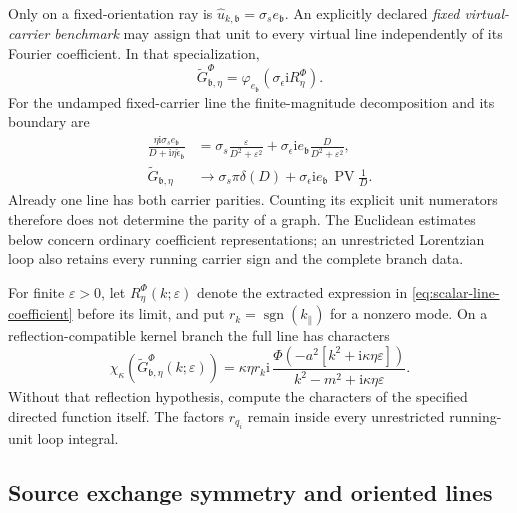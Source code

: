 \documentclass[final,5p,times,twocolumn,numbers,nopreprintline]{elsarticle}
\numberwithin{equation}{section}
\theoremstyle{definition}
\theoremstyle{remark}
\newcommand{\ii}{\mathrm i}
\newcommand{\bb}{\mathfrak b}
\newcommand{\Ph}{\Phi}
\newcommand{\PV}{\operatorname{PV}}
\newcommand{\sgn}{\operatorname{sgn}}
\newcommand{\ee}{e_{\bb}}
\newcommand{\epsvec}{\hat\epsilon_{\bb}}
\newcommand{\embed}{\varphi_{\ee}}
\begin{document}
Only on a fixed-orientation ray is
\(\widehat u_{k,\bb}=\sigma_s\ee\). An explicitly declared
\emph{fixed virtual-carrier benchmark} may assign that unit to
every virtual line independently of its Fourier coefficient. In
that specialization,
\begin{equation}
 \widetilde G^\Ph_{\bb,\eta}
    =\embed(\sigma_\epsilon\ii R_\eta^\Ph).
 \label{eq:fixed-carrier-line}
\end{equation}
For the undamped fixed-carrier line the finite-magnitude decomposition
and its boundary are
\begin{align}
 \frac{\eta\ii\sigma_s\ee}{D+\ii\eta\epsvec}
 &=\sigma_s\frac{\varepsilon}{D^2+\varepsilon^2}
   +\sigma_\epsilon\ii\ee\frac{D}{D^2+\varepsilon^2},\nonumber\\
 \widetilde G_{\bb,\eta}
 &\longrightarrow\sigma_s\pi\delta(D)
     +\sigma_\epsilon\ii\ee\,\PV\frac1D.
 \label{eq:carrier-pv-delta}
\end{align}
Already one line has both carrier parities. Counting its explicit
unit numerators therefore does not determine the parity of a graph.
The Euclidean estimates below concern ordinary coefficient
representations; an unrestricted Lorentzian loop also retains every
running carrier sign and the complete branch data.

For finite \(\varepsilon>0\), let
\(R_\eta^\Ph(k;\varepsilon)\) denote the extracted expression
in \eqref{eq:scalar-line-coefficient} before its limit, and put
\(r_k=\sgn(k_\parallel)\) for a nonzero mode. On a
reflection-compatible kernel branch the full line has characters
\begin{equation}
 \chi_\kappa\!\left(\widetilde G^\Ph_{\bb,\eta}
                  (k;\varepsilon)\right)
 =\kappa\eta r_k\ii\,
  \frac{\Ph(-a^2[k^2+\ii\kappa\eta\varepsilon])}
       {k^2-m^2+\ii\kappa\eta\varepsilon}.
 \label{eq:line-character-values}
\end{equation}
Without that reflection hypothesis, compute the characters of the
specified directed function itself. The factors \(r_{q_i}\)
remain inside every unrestricted running-unit loop integral.

\subsection{Source exchange symmetry and oriented lines}
\label{sec:source-exchange}
\end{document}
